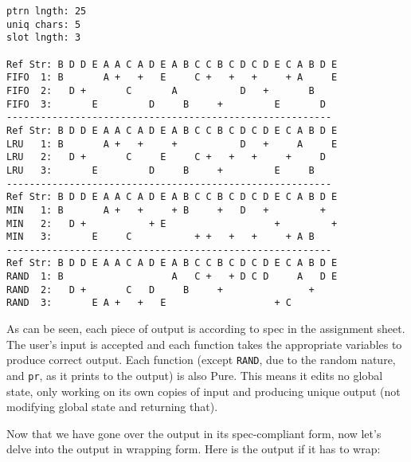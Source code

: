 \documentclass[11pt]{article}
\begin{document}
\begin{lstlisting}
ptrn lngth: 25
uniq chars: 5
slot lngth: 3

Ref Str: B D D E A A C A D E A B C C B C D C D E C A B D E
FIFO  1: B       A +   +   E     C +   +   +     + A     E
FIFO  2:   D +       C       A           D   +       B
FIFO  3:       E         D     B     +         E       D
---------------------------------------------------------
Ref Str: B D D E A A C A D E A B C C B C D C D E C A B D E
LRU   1: B       A +   +     +           D   +     A     E
LRU   2:   D +       C     E     C +   +   +     +     D
LRU   3:       E         D     B     +         E     B
---------------------------------------------------------
Ref Str: B D D E A A C A D E A B C C B C D C D E C A B D E
MIN   1: B       A +   +     + B     +   D   +         +
MIN   2:   D +           + E                   +         +
MIN   3:       E     C           + +   +   +     + A B
---------------------------------------------------------
Ref Str: B D D E A A C A D E A B C C B C D C D E C A B D E
RAND  1: B                   A   C +   + D C D     A   D E
RAND  2:   D +       C   D     B     +               +
RAND  3:       E A +   +   E                   + C
\end{lstlisting}

As can be seen, each piece of output is according to spec in the assignment sheet.
The user's input is accepted and each function takes the appropriate variables to produce correct output.
Each function (except \texttt{RAND}, due to the random nature, and \texttt{pr}, as it prints to the output) is also Pure.
This means it edits no global state, only working on its own copies of input and producing unique output (not modifying global state and returning that).

Now that we have gone over the output in its spec-compliant form, now let's delve into the output in wrapping form.
Here is the output if it has to wrap:
\end{document}

